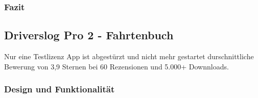 \documentclass[a4paper]{article}
\begin{document}
\subsubsection{Fazit}

\subsection{Driverslog Pro 2 - Fahrtenbuch}
Nur eine Testlizenz
App ist abgestürzt und nicht mehr gestartet
durschnittliche Bewerung von 3,9 Sternen bei 60 Rezensionen und 5.000+ Downnloads.

\subsubsection{Design und Funktionalität}
\end{document}
